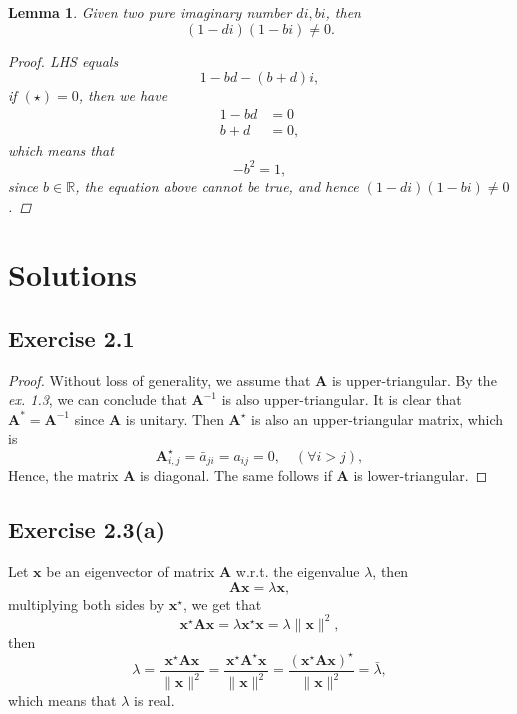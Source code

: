 \documentclass{article}
\newtheorem{lemma}{Lemma}[section]
\begin{document}
    \begin{lemma}
    Given two pure imaginary number $di, bi$, then 
    $$
    (1-di) (1-bi) \neq 0.
    $$
    \begin{proof}
    LHS equals
    \begin{equation*}
    1-bd - (b+d)i, \tag{$\star$}
    \end{equation*}
    if $(\star) = 0$, then we have
    $$
    \begin{aligned}
    1 - bd &= 0 \\
    b+d &=0,
    \end{aligned}
    $$
    which means that
    $$
    -b^2 = 1,
    $$
    since $b \in \mathbb{R}$, the equation above cannot be true, and hence $(1-di)(1-bi) \neq 0$.
    \end{proof}
    \end{lemma}

\section{Solutions}
\subsection{Exercise 2.1}
    \begin{proof}
        Without loss of generality, we assume that $\bm{A}$ is upper-triangular. By the \textit{ex. 1.3}, we can conclude that $\bm{A}^{-1}$ is also upper-triangular. It is clear that $\bm{A}^{*} = \bm{A}^{-1}$ since $\bm{A}$ is unitary. Then $\bm{A}^{\star}$ is also an upper-triangular matrix, which is
        $$
        \bm{A}^{\star}_{i,j} = \bar{a}_{ji} = a_{ij} = 0, \quad (\forall i > j),
        $$
        Hence, the matrix $\bm{A}$ is diagonal. The same follows if $\bm{A}$ is lower-triangular.
    \end{proof}

	
\subsection{Exercise 2.3(a)}
    Let $\bm{x}$ be an eigenvector of matrix $\bm{A}$ w.r.t. the eigenvalue $\lambda$, then
    \[\bm{A}\bm{x} = \lambda \bm{x},\]
    multiplying both sides by $\bm{x}^{\star}$, we get that
    \begin{equation*}
    \bm{x}^{\star} \bm{A} \bm{x} = \lambda \bm{x}^{\star}\bm{x} = \lambda \| \bm{x} \|^{2}, \tag{$\spadesuit$}
    \end{equation*}
    then 
    $$
    \lambda = \frac{\bm{x}^{\star} \bm{A} \bm{x} }{ \| \bm{x} \|^{2}} = \frac{\bm{x}^{\star} \bm{A}^{\star} \bm{x} }{ \| \bm{x} \|^{2}} = \frac{(\bm{x}^{\star} \bm{A} \bm{x} )^{\star}}{ \| \bm{x} \|^{2}} = \bar{\lambda},
    $$
    which means that $\lambda$ is real. 
    
\end{document}
